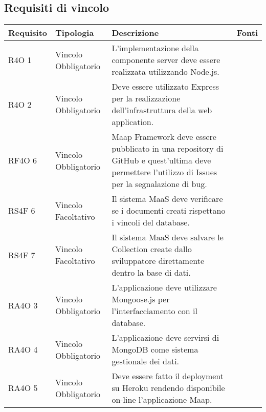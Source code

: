 \subsection{Requisiti di vincolo }

      \begin{center}
      \begin{longtable}{ | p{2cm} | p{2cm} | p{5cm} | p{2cm} |}
    
      \cellcolor[gray]{0.9} \textbf{Requisito} & \cellcolor[gray]{0.9} \textbf{Tipologia} 
      & \cellcolor[gray]{0.9} \textbf{Descrizione} & \cellcolor[gray]{0.9} \textbf{Fonti} \\ \hline
      
        R4O 1 & Vincolo \newline  Obbligatorio  & L’implementazione della componente server deve essere realizzata utilizzando Node.js. &  \\ \hline      
        R4O 2 & Vincolo \newline  Obbligatorio  & Deve essere utilizzato Express per la realizzazione dell’infrastruttura della web application. &  \\ \hline      
        RF4O 6 & Vincolo \newline  Obbligatorio  & Maap Framework deve essere pubblicato in una repository di GitHub e quest'ultima deve permettere l'utilizzo di Issues per la segnalazione di bug. &  \\ \hline      
        RS4F 6 & Vincolo \newline  Facoltativo  & Il sistema MaaS deve verificare se i documenti creati rispettano i vincoli del database. &  \\ \hline      
        RS4F 7 & Vincolo \newline  Facoltativo  & Il sistema MaaS deve salvare le Collection create dallo sviluppatore direttamente dentro la base di dati. &  \\ \hline      
        RA4O 3 & Vincolo \newline  Obbligatorio  & L’applicazione deve utilizzare Mongoose.js per l’interfacciamento con il database. &  \\ \hline      
        RA4O 4 & Vincolo \newline  Obbligatorio  & L’applicazione deve servirsi di  MongoDB come sistema gestionale dei dati. &  \\ \hline      
        RA4O 5 & Vincolo \newline  Obbligatorio  & Deve essere fatto il deployment su Heroku rendendo disponibile on-line l’applicazione Maap. &  \\ \hline
      \end{longtable}
      \end{center}  
\clearpage
